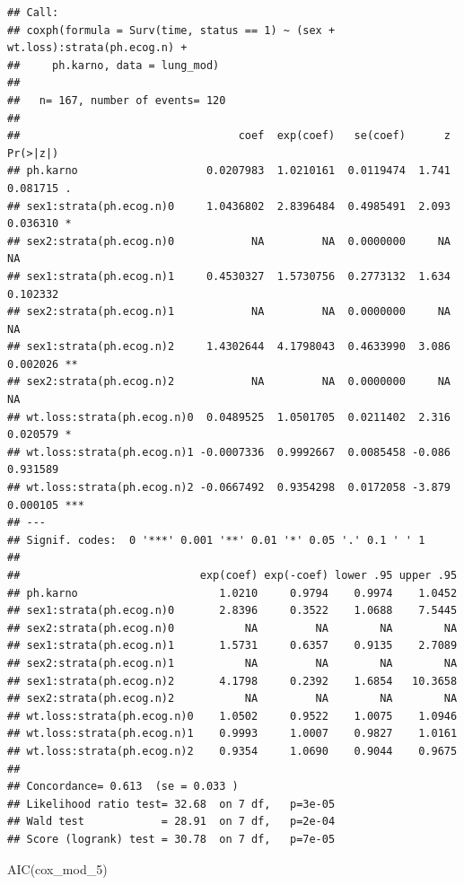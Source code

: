 \documentclass[
]{article}
\newenvironment{Shaded}{\begin{snugshade}}{\end{snugshade}}
\newcommand{\FunctionTok}[1]{\textcolor[rgb]{0.00,0.00,0.00}{#1}}
\newcommand{\NormalTok}[1]{#1}
\begin{document}
\begin{verbatim}
## Call:
## coxph(formula = Surv(time, status == 1) ~ (sex + wt.loss):strata(ph.ecog.n) + 
##     ph.karno, data = lung_mod)
## 
##   n= 167, number of events= 120 
## 
##                                  coef  exp(coef)   se(coef)      z Pr(>|z|)    
## ph.karno                    0.0207983  1.0210161  0.0119474  1.741 0.081715 .  
## sex1:strata(ph.ecog.n)0     1.0436802  2.8396484  0.4985491  2.093 0.036310 *  
## sex2:strata(ph.ecog.n)0            NA         NA  0.0000000     NA       NA    
## sex1:strata(ph.ecog.n)1     0.4530327  1.5730756  0.2773132  1.634 0.102332    
## sex2:strata(ph.ecog.n)1            NA         NA  0.0000000     NA       NA    
## sex1:strata(ph.ecog.n)2     1.4302644  4.1798043  0.4633990  3.086 0.002026 ** 
## sex2:strata(ph.ecog.n)2            NA         NA  0.0000000     NA       NA    
## wt.loss:strata(ph.ecog.n)0  0.0489525  1.0501705  0.0211402  2.316 0.020579 *  
## wt.loss:strata(ph.ecog.n)1 -0.0007336  0.9992667  0.0085458 -0.086 0.931589    
## wt.loss:strata(ph.ecog.n)2 -0.0667492  0.9354298  0.0172058 -3.879 0.000105 ***
## ---
## Signif. codes:  0 '***' 0.001 '**' 0.01 '*' 0.05 '.' 0.1 ' ' 1
## 
##                            exp(coef) exp(-coef) lower .95 upper .95
## ph.karno                      1.0210     0.9794    0.9974    1.0452
## sex1:strata(ph.ecog.n)0       2.8396     0.3522    1.0688    7.5445
## sex2:strata(ph.ecog.n)0           NA         NA        NA        NA
## sex1:strata(ph.ecog.n)1       1.5731     0.6357    0.9135    2.7089
## sex2:strata(ph.ecog.n)1           NA         NA        NA        NA
## sex1:strata(ph.ecog.n)2       4.1798     0.2392    1.6854   10.3658
## sex2:strata(ph.ecog.n)2           NA         NA        NA        NA
## wt.loss:strata(ph.ecog.n)0    1.0502     0.9522    1.0075    1.0946
## wt.loss:strata(ph.ecog.n)1    0.9993     1.0007    0.9827    1.0161
## wt.loss:strata(ph.ecog.n)2    0.9354     1.0690    0.9044    0.9675
## 
## Concordance= 0.613  (se = 0.033 )
## Likelihood ratio test= 32.68  on 7 df,   p=3e-05
## Wald test            = 28.91  on 7 df,   p=2e-04
## Score (logrank) test = 30.78  on 7 df,   p=7e-05
\end{verbatim}

\begin{Shaded}
\begin{Highlighting}[]
\FunctionTok{AIC}\NormalTok{(cox\_mod\_5)}
\end{Highlighting}
\end{Shaded}
\end{document}

